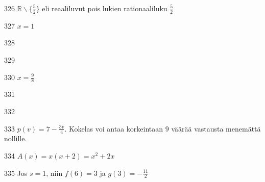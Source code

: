 \begin{Vastaus}{326}
   $\mathbb{R} \backslash \lbrace \frac{5}{2} \rbrace$ eli reaaliluvut pois lukien rationaaliluku $\frac{5}{2}$
  
\end{Vastaus}
\begin{Vastaus}{327}
    $x=1$
    
\end{Vastaus}
\begin{Vastaus}{328}
	 
\end{Vastaus}
\begin{Vastaus}{329}
  
\end{Vastaus}
\begin{Vastaus}{330}
$x=\frac{9}{8}$
  
\end{Vastaus}
\begin{Vastaus}{331}
  
\end{Vastaus}
\begin{Vastaus}{332}
	\alakohdatm{
	§ $\mathbb{R}$
	§ $\mathbb{R}$ $\setminus \lbrace 0 \rbrace$
	§ $\mathbb{R}_+$ (tai $\mathbb{R}_{\geq 0}$ tai $[0, \infty [$)
	§ $\mathbb{R}$
	}
	
\end{Vastaus}
\begin{Vastaus}{333}
		$p(v) = 7-\frac{3v}{4}$. Kokelas voi antaa korkeintaan $9$ väärää vastausta menemättä nollille.
	
\end{Vastaus}
\begin{Vastaus}{334}
    $A(x) = x(x+2)=x^2+2x$
  
\end{Vastaus}
\begin{Vastaus}{335}
   Jos $s=1$, niin $f(6) = 3$ ja $g(3) = -\frac{11}{2}$
  
\end{Vastaus}
